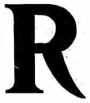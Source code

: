 \begin{figure}[ht]
\begin{minipage}[5cm]{0.3\textwidth}
\begin{subfigure}{1.9cm}
        \end{subfigure}

        \begin{subfigure}{2cm}
            \includegraphics[width=\linewidth]{Images/logo FPs/titles/LCE-1921-12-09-a-i0059.jpg}
            
        \end{subfigure}


\end{minipage}
\end{figure}
